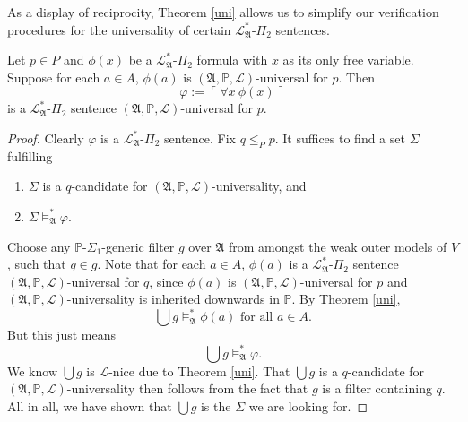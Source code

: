 \documentclass[12pt]{article}
\numberwithin{equation}{section}
\begin{document}
As a display of reciprocity, Theorem \ref{uni} allows us to simplify our verification procedures for the universality of certain $\mathcal{L}^{*}_{\mathfrak{A}}$-$\Pi_2$ sentences. 

\begin{lem}\label{univer}
Let $p \in P$ and $\phi(x)$ be a $\mathcal{L}^{*}_{\mathfrak{A}}$-$\Pi_2$ formula with $x$ as its only free variable. Suppose for each $a \in A$, $\phi(a)$ is $(\mathfrak{A}, \mathbb{P}, \mathcal{L})$-universal for $p$. Then
\begin{equation*}
    \varphi := \ulcorner \forall x \ \phi(x) \urcorner
\end{equation*}
is a $\mathcal{L}^{*}_{\mathfrak{A}}$-$\Pi_2$ sentence $(\mathfrak{A}, \mathbb{P}, \mathcal{L})$-universal for $p$.
\end{lem}
\begin{proof}
Clearly $\varphi$ is a $\mathcal{L}^{*}_{\mathfrak{A}}$-$\Pi_2$ sentence. Fix $q \leq_P p$. It suffices to find a set $\Sigma$ fulfilling
\begin{enumerate}[label=(\alph*)]
    \item $\Sigma$ is a $q$-candidate for $(\mathfrak{A}, \mathbb{P}, \mathcal{L})$-universality, and 
    \item $\Sigma \models^{*}_{\mathfrak{A}} \varphi$.
\end{enumerate}

Choose any $\mathbb{P}$-$\Sigma_1$-generic filter $g$ over $\mathfrak{A}$ from amongst the weak outer models of $V$, such that $q \in g$. Note that for each $a \in A$, $\phi(a)$ is a $\mathcal{L}^{*}_{\mathfrak{A}}$-$\Pi_2$ sentence $(\mathfrak{A}, \mathbb{P}, \mathcal{L})$-universal for $q$, since $\phi(a)$ is $(\mathfrak{A}, \mathbb{P}, \mathcal{L})$-universal for $p$ and $(\mathfrak{A}, \mathbb{P}, \mathcal{L})$-universality is inherited downwards in $\mathbb{P}$. By Theorem \ref{uni},
\begin{equation*}
    \bigcup g \models^{*}_{\mathfrak{A}} \phi(a) \text{ for all } a \in A \text{.}
\end{equation*}
But this just means 
\begin{equation*}
    \bigcup g \models^{*}_{\mathfrak{A}} \varphi \text{.}
\end{equation*}
We know $\bigcup g$ is $\mathcal{L}$-nice due to Theorem \ref{uni}. That $\bigcup g$ is a $q$-candidate for $(\mathfrak{A}, \mathbb{P}, \mathcal{L})$-universality then follows from the fact that $g$ is a filter containing $q$. All in all, we have shown that $\bigcup g$ is the $\Sigma$ we are looking for.
\end{proof}
\end{document}
